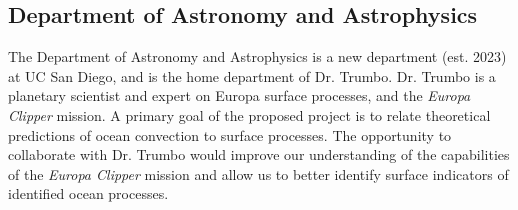 \documentclass[12pt]{article}
\begin{document}
\subsection*{Department of Astronomy and Astrophysics}
The Department of Astronomy and Astrophysics is a new department (est. 2023) at UC San Diego, and is the home department of Dr. Trumbo. Dr. Trumbo is a planetary scientist and expert on Europa surface processes, and the \textit{Europa Clipper} mission. 
A primary goal of the proposed project is to relate theoretical predictions of ocean convection to surface processes. The opportunity to collaborate with Dr. Trumbo would improve our understanding of the capabilities of the \textit{Europa Clipper} mission and allow us to better identify surface indicators of identified ocean processes.


\printbibliography
\end{document}
